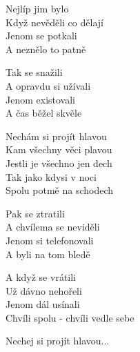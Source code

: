 
\ve{}
Nejlíp jim bylo \\ 
Když nevěděli co dělají \quad {} \quad {}\\ 
Jenom se potkali\\
A neznělo to patně  

\ve{}
Tak se snažili\\
A opravdu si užívali\\
Jenom existovali\\
A čas běžel skvěle 

\cho{}
Nechám si projít hlavou\\
Kam všechny věci plavou\\
Jestli je všechno jen dech\\
Tak jako kdysi v noci\\
Spolu potmě na schodech \quad {} 

\ve{}
Pak se ztratili\\
A chvílema se neviděli\\
Jenom si telefonovali\\
A byli na tom bledě

\ve{}
A když se vrátili\\
Už dávno nehořeli\\
Jenom dál usínali\\
Chvíli spolu - chvíli vedle sebe 

\cho{}

\cho{}
Nechej si projít hlavou...

\esong